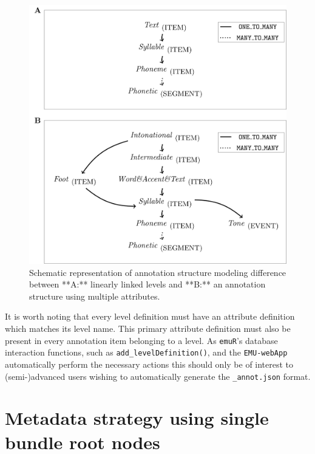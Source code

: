 \documentclass[]{book}
\begin{document}
\begin{figure}

{\centering \includegraphics[width=0.75\linewidth]{pics/annotStruct} 

}

\caption{Schematic representation of annotation structure modeling difference between **A:** linearly linked levels and **B:** an annotation structure using multiple attributes.}\label{fig:paraLabels}
\end{figure}

It is worth noting that every level definition must have an attribute definition which matches its level name. This primary attribute definition must also be present in every annotation item belonging to a level. As \texttt{emuR}'s database interaction functions, such as \texttt{add\_levelDefinition()}, and the \texttt{EMU-webApp} automatically perform the necessary actions this should only be of interest to (semi-)advanced users wishing to automatically generate the \texttt{\_annot.json} format.

\hypertarget{metadata-strategy-using-single-bundle-root-nodes}{%
\section{Metadata strategy using single bundle root nodes}\label{metadata-strategy-using-single-bundle-root-nodes}}
\end{document}
